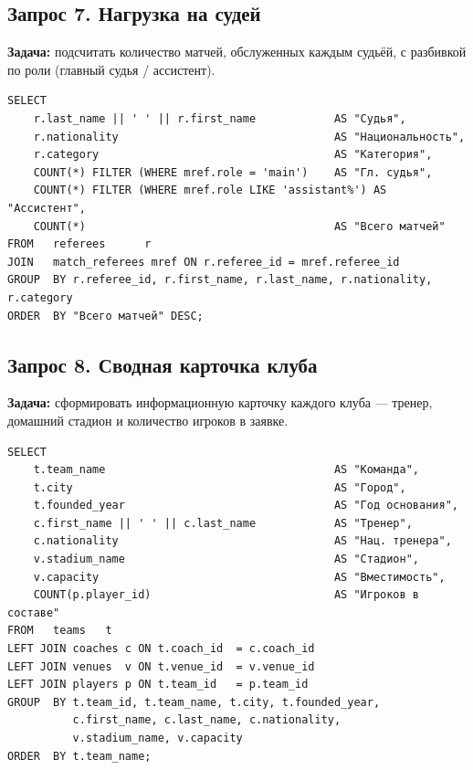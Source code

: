 \documentclass[14pt,a4paper]{extarticle}
\begin{document}
\subsection{Запрос 7. Нагрузка на судей}

\textbf{Задача:} подсчитать количество матчей, обслуженных каждым судьёй,
с разбивкой по роли (главный судья / ассистент).

\begin{listing}[H]
\caption{Нагрузка на судей — количество обслуженных матчей}
\begin{verbatim}
SELECT
    r.last_name || ' ' || r.first_name            AS "Судья",
    r.nationality                                 AS "Национальность",
    r.category                                    AS "Категория",
    COUNT(*) FILTER (WHERE mref.role = 'main')    AS "Гл. судья",
    COUNT(*) FILTER (WHERE mref.role LIKE 'assistant%') AS "Ассистент",
    COUNT(*)                                      AS "Всего матчей"
FROM   referees      r
JOIN   match_referees mref ON r.referee_id = mref.referee_id
GROUP  BY r.referee_id, r.first_name, r.last_name, r.nationality, r.category
ORDER  BY "Всего матчей" DESC;
\end{verbatim}
\end{listing}

\subsection{Запрос 8. Сводная карточка клуба}

\textbf{Задача:} сформировать информационную карточку каждого клуба —
тренер, домашний стадион и количество игроков в заявке.

\begin{listing}[H]
\caption{Состав команд с тренерами и стадионами}
\begin{verbatim}
SELECT
    t.team_name                                   AS "Команда",
    t.city                                        AS "Город",
    t.founded_year                                AS "Год основания",
    c.first_name || ' ' || c.last_name            AS "Тренер",
    c.nationality                                 AS "Нац. тренера",
    v.stadium_name                                AS "Стадион",
    v.capacity                                    AS "Вместимость",
    COUNT(p.player_id)                            AS "Игроков в составе"
FROM   teams   t
LEFT JOIN coaches c ON t.coach_id  = c.coach_id
LEFT JOIN venues  v ON t.venue_id  = v.venue_id
LEFT JOIN players p ON t.team_id   = p.team_id
GROUP  BY t.team_id, t.team_name, t.city, t.founded_year,
          c.first_name, c.last_name, c.nationality,
          v.stadium_name, v.capacity
ORDER  BY t.team_name;
\end{verbatim}
\end{listing}
\end{document}
